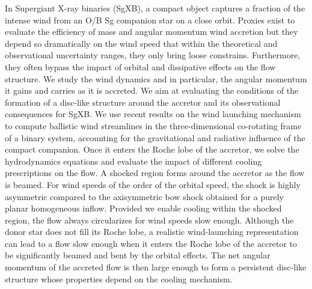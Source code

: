 \documentclass{aa}
\newcommand{\sgx}{SgXB\xspace}
\begin{document}
  \abstract
   {In Supergiant X-ray binaries (\sgx), a compact object captures a fraction of the intense wind from an O/B Sg companion star on a close orbit. Proxies exist to evaluate the efficiency of mass and angular momentum wind accretion but they depend so dramatically on the wind speed that within the theoretical and observational uncertainty ranges, they only bring loose constrains. Furthermore, they often bypass the impact of orbital and dissipative effects on the flow structure.
}
   {We study the wind dynamics and in particular, the angular momentum it gains and carries as it is accreted. We aim at evaluating the conditions of the formation of a disc-like structure around the accretor and its observational consequences for \sgx. 
}
   {We use recent results on the wind launching mechanism to compute ballistic wind streamlines in the three-dimensional co-rotating frame of a binary system, accounting for the gravitational and radiative influence of the compact companion. Once it enters the Roche lobe of the accretor, we solve the hydrodynamics equations and evaluate the impact of different cooling prescriptions on the flow.}
   {A shocked region forms around the accretor as the flow is beamed. For wind speeds of the order of the orbital speed, the shock is highly asymmetric compared to the axisymmetric bow shock obtained for a purely planar homogeneous inflow. Provided we enable cooling within the shocked region, the flow always circularizes for wind speeds slow enough.
}
   {Although the donor star does not fill its Roche lobe, a realistic wind-launching representation can lead to a flow slow enough when it enters the Roche lobe of the accretor to be significantly beamed and bent by the orbital effects. The net angular momentum of the accreted flow is then large enough to form a persistent disc-like structure whose properties depend on the cooling mechanism.
}


   \maketitle
%
\end{document}
